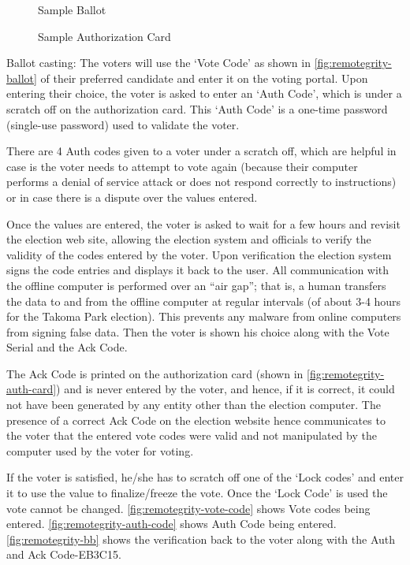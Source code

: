 \begin{figure}
  \centering {}
  \caption{Sample Ballot}
  \label{fig:remotegrity-ballot}
\end{figure}

\begin{figure}
  \centering {}
  \caption{Sample Authorization Card}
  \label{fig:remotegrity-auth-card}
\end{figure}

Ballot casting: The voters will use the `Vote Code' as shown in
\autoref{fig:remotegrity-ballot} of their preferred candidate and
enter it on the voting portal. Upon entering their choice, the voter
is asked to enter an `Auth Code', which is under a scratch off on the
authorization card. This `Auth Code' is a one-time password
(single-use password) used to validate the voter.

There are 4 Auth codes given to a voter under a scratch off, which are
helpful in case is the voter needs to attempt to vote again (because
their computer performs a denial of service attack or does not respond
correctly to instructions) or in case there is a dispute over the
values entered.

Once the values are entered, the voter is asked to wait for a few
hours and revisit the election web site, allowing the election system
and officials to verify the validity of the codes entered by the
voter. Upon verification the election system signs the code entries
and displays it back to the user. All communication with the offline
computer is performed over an ``air gap''; that is, a human transfers
the data to and from the offline computer at regular intervals (of
about 3-4 hours for the Takoma Park election). This prevents any
malware from online computers from signing false data. Then the voter
is shown his choice along with the Vote Serial and the Ack Code.

The Ack Code is printed on the authorization card (shown in
\autoref{fig:remotegrity-auth-card}) and is never entered by the
voter, and hence, if it is correct, it could not have been generated
by any entity other than the election computer. The presence of a
correct Ack Code on the election website hence communicates to the
voter that the entered vote codes were valid and not manipulated by
the computer used by the voter for voting.

If the voter is satisfied, he/she has to scratch off one of the `Lock
codes' and enter it to use the value to finalize/freeze the vote. Once
the `Lock Code' is used the vote cannot be
changed. \autoref{fig:remotegrity-vote-code} shows Vote codes being
entered. \autoref{fig:remotegrity-auth-code} shows Auth Code being
entered. \autoref{fig:remotegrity-bb} shows the verification back to
the voter along with the Auth and Ack Code-EB3C15.

